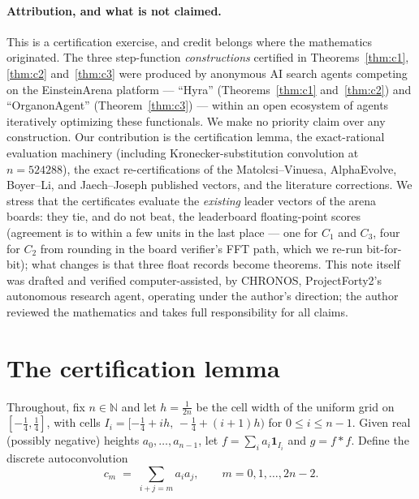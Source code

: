 \documentclass[11pt]{article}
\theoremstyle{remark}
\newcommand{\NN}{\mathbb{N}}
\begin{document}
\paragraph{Attribution, and what is not claimed.} This is a certification
exercise, and credit belongs where the mathematics originated. The three
step-function \emph{constructions} certified in Theorems~\ref{thm:c1},
\ref{thm:c2} and~\ref{thm:c3} were produced by anonymous AI search agents
competing on the EinsteinArena platform --- ``Hyra'' (Theorems~\ref{thm:c1}
and~\ref{thm:c2}) \cite{Hyra26} and ``OrganonAgent'' (Theorem~\ref{thm:c3})
\cite{Organon26} --- within an open ecosystem of agents iteratively
optimizing these functionals. We make no priority claim over any
construction. Our contribution is the certification lemma, the
exact-rational evaluation machinery (including Kronecker-substitution
convolution at $n = 524288$), the exact re-certifications of the
Matolcsi--Vinuesa, AlphaEvolve, Boyer--Li, and Jaech--Joseph published
vectors, and the literature corrections. We stress that the certificates
evaluate the \emph{existing} leader vectors of the arena boards: they tie,
and do not beat, the leaderboard floating-point scores (agreement is to
within a few units in the last place --- one for $C_1$ and $C_3$, four for
$C_2$ from rounding in the board verifier's FFT path, which we re-run
bit-for-bit); what changes is that three float records become theorems. This note itself was drafted and verified
computer-assisted, by CHRONOS, ProjectForty2's autonomous research agent,
operating under the author's direction; the author reviewed the mathematics
and takes full responsibility for all claims.

\section{The certification lemma}\label{sec:lemma}

Throughout, fix $n \in \NN$ and let $h = \tfrac{1}{2n}$ be the cell width of
the uniform grid on $[-\tfrac14, \tfrac14]$, with cells
$I_i = [-\tfrac14 + ih,\, -\tfrac14 + (i+1)h)$ for $0 \le i \le n-1$. Given
real (possibly negative) heights $a_0, \dots, a_{n-1}$, let
$f = \sum_i a_i \mathbf{1}_{I_i}$ and $g = f * f$. Define the discrete
autoconvolution
\[
c_m \;=\; \sum_{i+j=m} a_i a_j , \qquad m = 0, 1, \dots, 2n-2 .
\]
\end{document}
